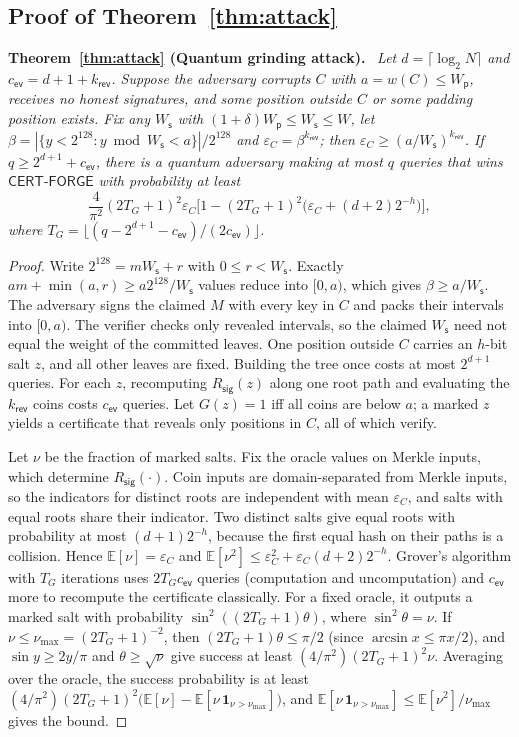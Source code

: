 \documentclass[10pt,journal,compsoc]{IEEEtran}
\theoremstyle{tplain}
\theoremstyle{tdef}
\theoremstyle{remark}
\newcommand{\Ws}{W_{\mathsf{s}}}
\newcommand{\Wp}{W_{\mathsf{p}}}
\newcommand{\Rsig}{R_{\mathsf{sig}}}
\newcommand{\kr}{k_{\mathsf{rev}}}
\newenvironment{restate}[1]{\par\smallskip\noindent\textbf{#1.}\ \itshape\ignorespaces}{\par\smallskip}
\begin{document}
\subsection{Proof of Theorem~\ref{thm:attack}}\label{S-cert-attack}
\begin{restate}{Theorem~\ref{thm:attack} (Quantum grinding attack)}
Let $d=\lceil\log_2 N\rceil$ and $c_{\mathsf{ev}}=d+1+\kr$. Suppose the adversary corrupts $C$ with $a=w(C)\le\Wp$, receives no honest signatures, and some position outside $C$ or some padding position exists. Fix any $\Ws$ with $(1+\delta)\Wp\le\Ws\le W$, let $\beta=|\{y<2^{128}: y\bmod\Ws<a\}|/2^{128}$ and $\varepsilon_C=\beta^{\kr}$; then $\varepsilon_C\ge(a/\Ws)^{\kr}$. If $q\ge 2^{d+1}+c_{\mathsf{ev}}$, there is a quantum adversary making at most $q$ queries that wins $\mathsf{CERT\text{-}FORGE}$ with probability at least
\[
\frac{4}{\pi^2}(2T_G+1)^2\varepsilon_C\Big[1-(2T_G+1)^2\big(\varepsilon_C+(d+2)2^{-h}\big)\Big],
\]
where $T_G=\lfloor(q-2^{d+1}-c_{\mathsf{ev}})/(2c_{\mathsf{ev}})\rfloor$.
\end{restate}

\begin{proof}
Write $2^{128}=m\Ws+r$ with $0\le r<\Ws$. Exactly $am+\min(a,r)\ge a2^{128}/\Ws$ values reduce into $[0,a)$, which gives $\beta\ge a/\Ws$. The adversary signs the claimed $M$ with every key in $C$ and packs their intervals into $[0,a)$. The verifier checks only revealed intervals, so the claimed $\Ws$ need not equal the weight of the committed leaves. One position outside $C$ carries an $h$-bit salt $z$, and all other leaves are fixed. Building the tree once costs at most $2^{d+1}$ queries. For each $z$, recomputing $\Rsig(z)$ along one root path and evaluating the $\kr$ coins costs $c_{\mathsf{ev}}$ queries. Let $G(z)=1$ iff all coins are below $a$; a marked $z$ yields a certificate that reveals only positions in $C$, all of which verify.

Let $\nu$ be the fraction of marked salts. Fix the oracle values on Merkle inputs, which determine $\Rsig(\cdot)$. Coin inputs are domain-separated from Merkle inputs, so the indicators for distinct roots are independent with mean $\varepsilon_C$, and salts with equal roots share their indicator. Two distinct salts give equal roots with probability at most $(d+1)2^{-h}$, because the first equal hash on their paths is a collision. Hence $\mathbb E[\nu]=\varepsilon_C$ and $\mathbb E[\nu^2]\le\varepsilon_C^2+\varepsilon_C(d+2)2^{-h}$. Grover's algorithm with $T_G$ iterations uses $2T_Gc_{\mathsf{ev}}$ queries (computation and uncomputation) and $c_{\mathsf{ev}}$ more to recompute the certificate classically. For a fixed oracle, it outputs a marked salt with probability $\sin^2((2T_G+1)\theta)$, where $\sin^2\theta=\nu$. If $\nu\le\nu_{\max}=(2T_G+1)^{-2}$, then $(2T_G+1)\theta\le\pi/2$ (since $\arcsin x\le\pi x/2$), and $\sin y\ge 2y/\pi$ and $\theta\ge\sqrt\nu$ give success at least $(4/\pi^2)(2T_G+1)^2\nu$. Averaging over the oracle, the success probability is at least $(4/\pi^2)(2T_G+1)^2\big(\mathbb E[\nu]-\mathbb E[\nu\,\mathbf 1_{\nu>\nu_{\max}}]\big)$, and $\mathbb E[\nu\,\mathbf 1_{\nu>\nu_{\max}}]\le\mathbb E[\nu^2]/\nu_{\max}$ gives the bound.
\end{proof}
\end{document}
